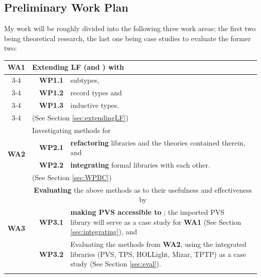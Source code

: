 
\subsection{Preliminary Work Plan}
	My work will be roughly divided into the following three work areas; the first two being theoretical research,
	the last one being case studies to evaluate the former two:
	
	\begin{tabular}{|c|c|c|p{12cm}|c|}\hline
		\multirow{5}{*}{\textbf{WA1}} &\multicolumn{4}{l|}{\textbf{Extending LF} (and \mmt) with} \\\cline{3-4}
			&\quad& \textbf{WP1.1} & subtypes, & \quad\\\cline{3-4}
			&\quad& \textbf{WP1.2} & record types and &\quad \\\cline{3-4}
			&\quad& \textbf{WP1.3} & inductive types. &\quad \\\cline{3-4}
			& \multicolumn{4}{l|}{(See Section \ref{sec:extendingLF})}\\\hline
		\multirow{4}{*}{\textbf{WA2}} &\multicolumn{4}{l|}{Investigating methods for} \\\cline{3-4}
			&\quad& \textbf{WP2.1} & \textbf{refactoring} libraries and the theories contained therein, 
											and & \quad\\\cline{3-4}
			&\quad& \textbf{WP2.2} & \textbf{integrating} formal libraries with each other. &\quad\\\cline{3-4}
			& \multicolumn{4}{l|}{(See Section \ref{sec:WPBC})}\\\hline
		\multirow{4}{*}{\textbf{WA3}} &\multicolumn{4}{p{12cm}|}{\textbf{Evaluating} the above methods
			as to their usefulness and effectiveness by} \\\cline{3-4}
			&\quad& \textbf{WP3.1} & \textbf{making PVS accessible to \mmt}; the imported PVS
				library will serve as a case study for \textbf{WA1} (See Section \ref{sec:integrating}), 
				and &\quad\\\cline{3-4}
			&\quad& \textbf{WP3.2} & Evaluating the methods from \textbf{WA2}, using the integrated
			libraries (PVS, TPS, HOLLight, Mizar, TPTP) as a case study (See Section \ref{sec:eval}).
			 &\quad\\\cline{3-4} &  \multicolumn{4}{l|}{\quad}\\\hline
	\end{tabular}
	
